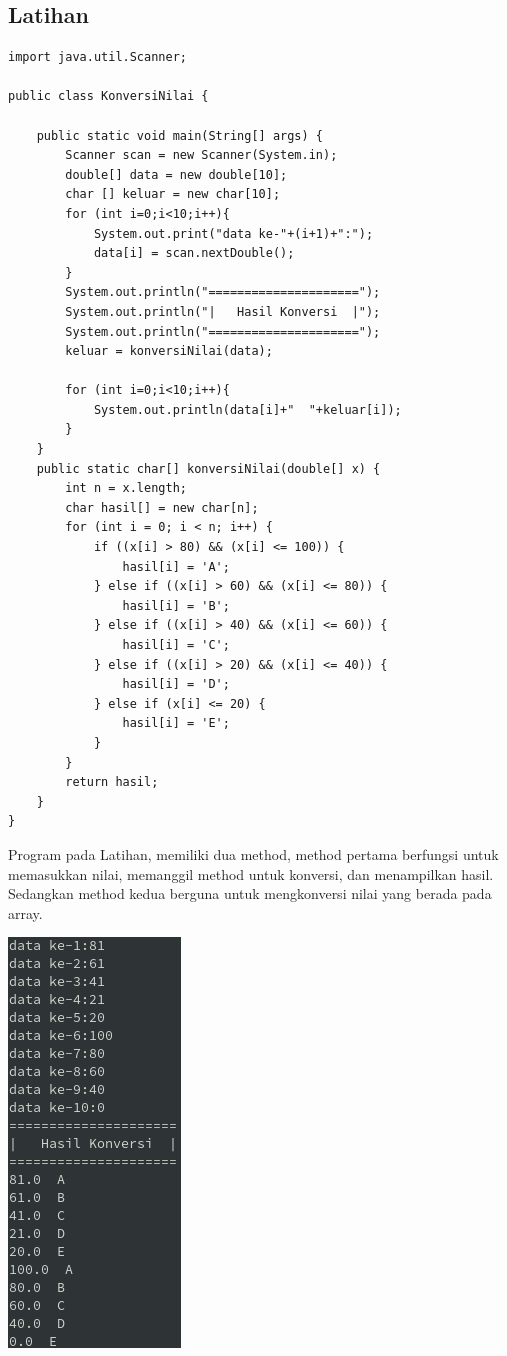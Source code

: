 \documentclass[a4paper,12pt]{article}
\begin{document}
\subsection{Latihan}
\begin{lstlisting}
import java.util.Scanner;

public class KonversiNilai {

    public static void main(String[] args) {
		Scanner scan = new Scanner(System.in);
		double[] data = new double[10];
		char [] keluar = new char[10];
		for (int i=0;i<10;i++){
			System.out.print("data ke-"+(i+1)+":");
			data[i] = scan.nextDouble();
		}
		System.out.println("=====================");
		System.out.println("|   Hasil Konversi  |");
		System.out.println("=====================");
		keluar = konversiNilai(data);

		for (int i=0;i<10;i++){
			System.out.println(data[i]+"  "+keluar[i]);
		}
	}
	public static char[] konversiNilai(double[] x) {
		int n = x.length;
        char hasil[] = new char[n];
        for (int i = 0; i < n; i++) {
			if ((x[i] > 80) && (x[i] <= 100)) {
				hasil[i] = 'A';
			} else if ((x[i] > 60) && (x[i] <= 80)) {
				hasil[i] = 'B';
			} else if ((x[i] > 40) && (x[i] <= 60)) {
				hasil[i] = 'C';
			} else if ((x[i] > 20) && (x[i] <= 40)) {
				hasil[i] = 'D';
			} else if (x[i] <= 20) {
				hasil[i] = 'E';
			}
		}
		return hasil;
	}
}
\end{lstlisting}

Program pada Latihan, memiliki dua method, method pertama berfungsi untuk memasukkan nilai, memanggil method untuk
konversi, dan menampilkan hasil. Sedangkan method kedua berguna untuk mengkonversi nilai yang berada pada array.

\begin{center}
    \includegraphics[scale=1]{8.png} 
\end{center}
\end{document}
